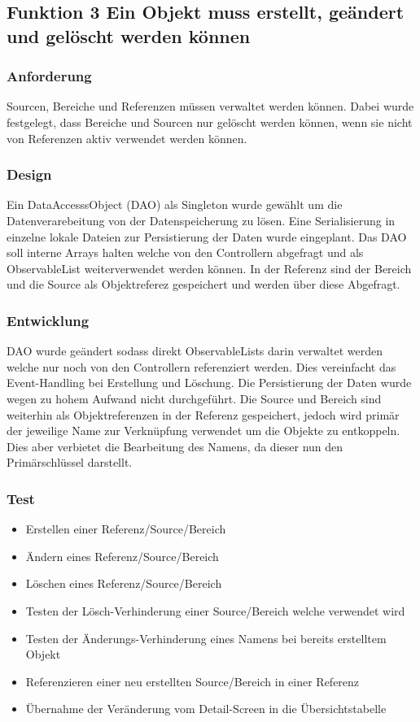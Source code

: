 \subsection[Funktion 3 CRUD]{Funktion 3 Ein Objekt muss erstellt, geändert und gelöscht werden können}

\subsubsection{Anforderung}
Sourcen, Bereiche und Referenzen müssen verwaltet werden können. Dabei wurde festgelegt, dass Bereiche und Sourcen nur gelöscht werden können, wenn sie nicht von Referenzen aktiv verwendet werden können.

\subsubsection{Design}
Ein DataAccesssObject (DAO) als Singleton wurde gewählt um die Datenverarebeitung von der Datenspeicherung zu lösen. Eine Serialisierung in einzelne lokale Dateien zur Persistierung der Daten wurde eingeplant. Das DAO soll interne Arrays halten welche von den Controllern abgefragt und als ObservableList weiterverwendet werden können. In der Referenz sind der Bereich und die Source als Objektreferez gespeichert und werden über diese Abgefragt.

\subsubsection{Entwicklung}
DAO wurde geändert sodass direkt ObservableLists darin verwaltet werden welche nur noch von den Controllern referenziert werden. Dies vereinfacht das Event-Handling bei Erstellung und Löschung. Die Persistierung der Daten wurde wegen zu hohem Aufwand nicht durchgeführt. Die Source und Bereich sind weiterhin als Objektreferenzen in der Referenz gespeichert, jedoch wird primär der jeweilige Name zur Verknüpfung verwendet um die Objekte zu entkoppeln. Dies aber verbietet die Bearbeitung des Namens, da dieser nun den Primärschlüssel darstellt.

\subsubsection{Test}
\begin{itemize}
	\item Erstellen einer Referenz/Source/Bereich
	\item Ändern eines Referenz/Source/Bereich
	\item Löschen eines Referenz/Source/Bereich
	\item Testen der Lösch-Verhinderung einer Source/Bereich welche verwendet wird
	\item Testen der Änderungs-Verhinderung eines Namens bei bereits erstelltem Objekt
	\item Referenzieren einer neu erstellten Source/Bereich in einer Referenz
	\item Übernahme der Veränderung vom Detail-Screen in die Übersichtstabelle
\end{itemize}

